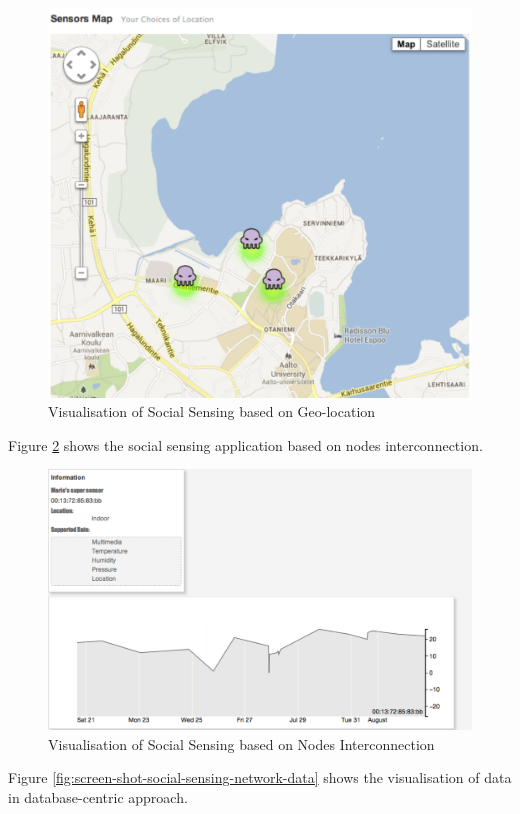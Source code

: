 \begin{appendices}
\begin{figure}[t]
  \begin{center}
    \includegraphics[width=1\textwidth]{images/screen-shot-social-sensing-map.pdf}
    \caption{Visualisation of Social Sensing based on Geo-location}
    \label{fig:screen-shot-social-sensing-map}
  \end{center}
\end{figure}

Figure \ref{fig:screen-shot-social-sensing-netowrk} shows the social sensing application based on nodes interconnection.

\begin{figure}[t]
  \begin{center}
    \includegraphics[width=1\textwidth]{images/screen-shot-social-sensing-netowrk.pdf}
    \caption{Visualisation of Social Sensing based on Nodes Interconnection}
    \label{fig:screen-shot-social-sensing-netowrk}
  \end{center}
\end{figure}
Figure \ref{fig:screen-shot-social-sensing-network-data} shows the visualisation of data in database-centric approach.


\end{appendices}
